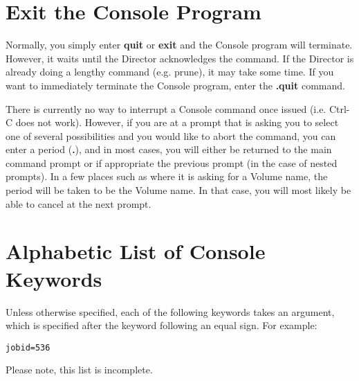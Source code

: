 \section{Exit the Console Program}

Normally, you simply enter {\bf quit} or {\bf exit} and the Console program
will terminate. However, it waits until the Director acknowledges the command.
If the Director is already doing a lengthy command (e.g. prune), it may take
some time. If you want to immediately terminate the Console program, enter the
{\bf .quit} command.

There is currently no way to interrupt a Console command once issued (i.e.
Ctrl-C does not work). However, if you are at a prompt that is asking you to
select one of several possibilities and you would like to abort the command,
you can enter a period ({\bf .}), and in most cases, you will either be
returned to the main command prompt or if appropriate the previous prompt (in
the case of nested prompts). In a few places such as where it is asking for a
Volume name, the period will be taken to be the Volume name. In that case, you
will most likely be able to cancel at the next prompt.

\section{Alphabetic List of Console Keywords}

Unless otherwise specified, each of the following keywords
takes an argument, which is specified after the keyword following
an equal sign. For example:

\begin{verbatim}
jobid=536
\end{verbatim}

Please note, this list is incomplete.


